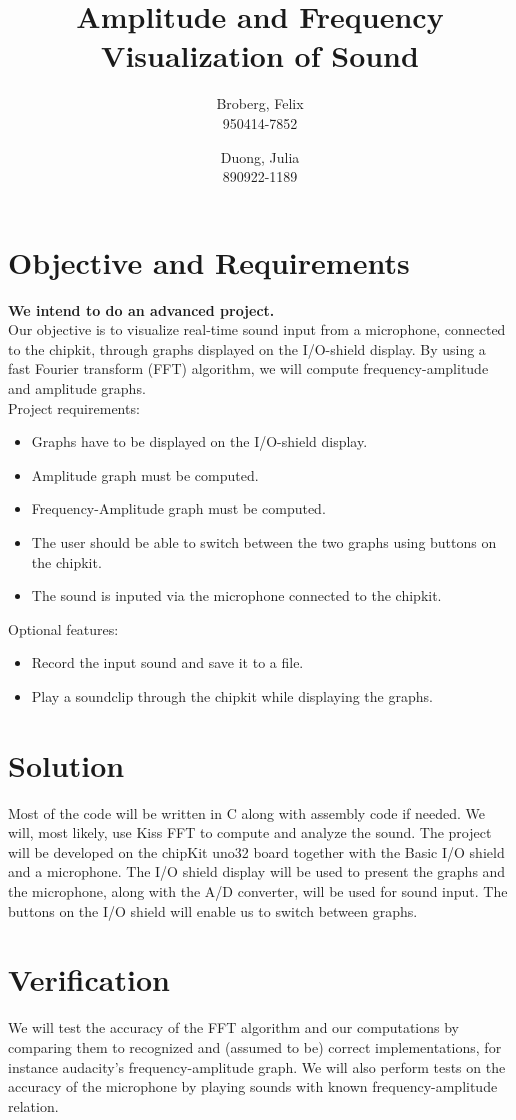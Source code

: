 \documentclass[a4paper,11pt]{article}
\author{
  Broberg, Felix\\
  950414-7852
  \and
  Duong, Julia\\
  890922-1189
}
\title{Amplitude and Frequency Visualization of Sound}
\begin{document}
\maketitle


\section*{Objective and Requirements}
\textbf{We intend to do an advanced project.}\\
Our objective is to visualize real-time sound input from a microphone, connected to the chipkit, through graphs displayed on the I/O-shield display. By using a fast Fourier transform (FFT) algorithm, we will compute frequency-amplitude and amplitude graphs.\\
\newline
Project requirements:
\begin{itemize}
\item Graphs have to be displayed on the I/O-shield display.
\item Amplitude graph must be computed.
\item Frequency-Amplitude graph must be computed.
\item The user should be able to switch between the two graphs using buttons on the chipkit.
\item The sound is inputed via the microphone connected to the chipkit.
\end{itemize}
Optional features:
\begin{itemize}
\item Record the input sound and save it to a file.
\item Play a soundclip through the chipkit while displaying the graphs.
\end{itemize}
\section*{Solution}
Most of the code will be written in C along with assembly code if needed. We will, most likely, use Kiss FFT to compute and analyze the sound. The project will be developed on the chipKit uno32 board together with the Basic I/O shield and a microphone. The I/O shield display will be used to present the graphs and the microphone, along with the A/D converter, will be used for sound input. The buttons on the I/O shield will enable us to switch between graphs.
\section*{Verification}
We will test the accuracy of the FFT algorithm and our computations by comparing them to recognized and (assumed to be) correct implementations, for instance audacity's frequency-amplitude graph. We will also perform tests on the accuracy of the microphone by playing sounds with known frequency-amplitude relation.
\end{document}
